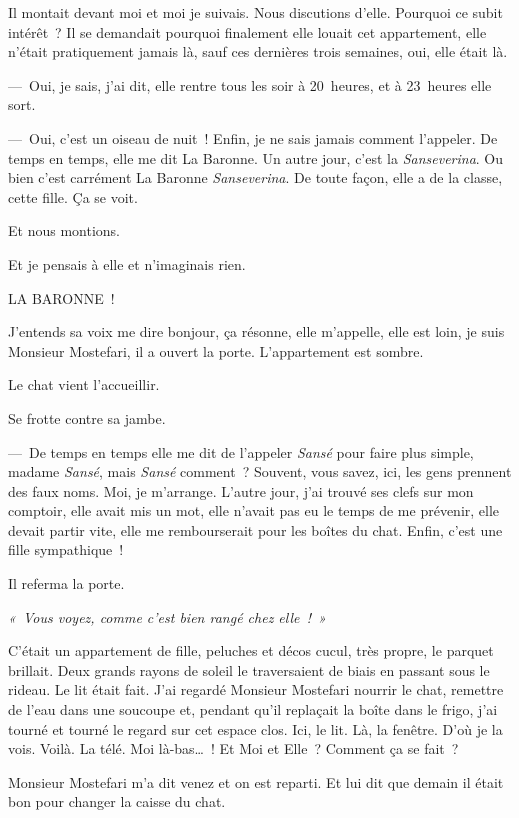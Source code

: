 \documentclass[french,twoside]{book} %
\begin{document}
\noindent Il montait devant moi et moi je suivais. Nous discutions d’elle. Pourquoi ce subit intérêt ? Il se demandait pourquoi finalement elle louait cet appartement, elle n’était pratiquement jamais là, sauf ces dernières trois semaines, oui, elle était là.\par
— Oui, je sais, j’ai dit, elle rentre tous les soir à 20 heures, et à 23 heures elle sort.\par
— Oui, c’est un oiseau de nuit ! Enfin, je ne sais jamais comment l’appeler. De temps en temps, elle me dit La Baronne. Un autre jour, c’est la \emph{Sanseverina}. Ou bien c’est carrément La Baronne \emph{Sanseverina}. De toute façon, elle a de la classe, cette fille. Ça se voit.\par
Et nous montions.\par
Et je pensais à elle et n’imaginais rien.\par
LA BARONNE !\par
J’entends sa voix me dire bonjour, ça résonne, elle m’appelle, elle est loin, je suis Monsieur Mostefari, il a ouvert la porte. L’appartement est sombre.\par
Le chat vient l’accueillir.\par
Se frotte contre sa jambe.\par
— De temps en temps elle me dit de l’appeler\emph{ Sansé} pour faire plus simple, madame \emph{Sansé}, mais \emph{Sansé} comment ? Souvent, vous savez, ici, les gens prennent des faux noms. Moi, je m’arrange. L’autre jour, j’ai trouvé ses clefs sur mon comptoir, elle avait mis un mot, elle n’avait pas eu le temps de me prévenir, elle devait partir vite, elle me rembourserait pour les boîtes du chat. Enfin, c’est une fille sympathique !\par
Il referma la porte.\par
{\itshape « Vous voyez, comme c’est bien rangé chez elle ! »}\par
C’était un appartement de fille, peluches et décos cucul, très propre, le parquet brillait. Deux grands rayons de soleil le traversaient de biais en passant sous le rideau. Le lit était fait. J’ai regardé Monsieur Mostefari nourrir le chat, remettre de l’eau dans une soucoupe et, pendant qu’il replaçait la boîte dans le frigo, j’ai tourné et tourné le regard sur cet espace clos. Ici, le lit. Là, la fenêtre. D’où je la vois. Voilà. La télé. Moi là-bas… ! Et Moi et Elle ? Comment ça se fait ?\par
Monsieur Mostefari m’a dit venez et on est reparti. Et lui dit que demain il était bon pour changer la caisse du chat.\par
\end{document}
